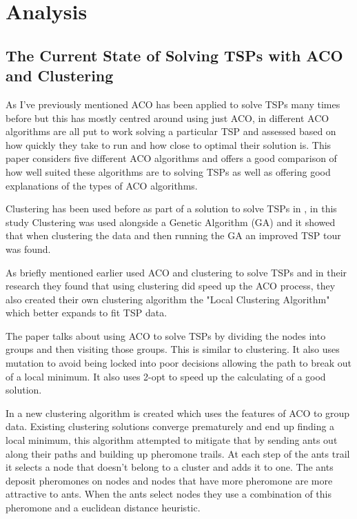 \section{Analysis}

\subsection{The Current State of Solving TSPs with ACO and Clustering}
As I've previously mentioned ACO has been applied to solve TSPs many times before but this has mostly centred around using just ACO, in \cite{assesmentdiffacofortsp} different ACO algorithms are all put to work solving a particular TSP and assessed based on how quickly they take to run and how close to optimal their solution is. This paper considers five different ACO algorithms and offers a good comparison of how well suited these algorithms are to solving TSPs as well as offering good explanations of the types of ACO algorithms. 

Clustering has been used before as part of a solution to solve TSPs in \cite{clustering_with_local_search_heuristic}, in this study Clustering was used alongside a Genetic Algorithm (GA) and it showed that when clustering the data and then running the GA an improved TSP tour was found.

As briefly mentioned earlier \cite{pang_chao-yang_ben-qiong_zhang_jie_wei_shan_zheng-chao_2014} used ACO and clustering to solve TSPs and in their research they found that using clustering did speed up the ACO process, they also created their own clustering algorithm the "Local Clustering Algorithm" which better expands to fit TSP data. 

The paper \cite{yang_shi_marchese_liang_2008} talks about using ACO to solve TSPs by dividing the nodes into groups and then visiting those groups. This is similar to clustering. It also uses mutation to avoid being locked into poor decisions allowing the path to break out of a local minimum. It also uses 2-opt to speed up the calculating of a good solution.

In \cite{10.1007/11839088_31} a new clustering algorithm is created which uses the features of ACO to group data. Existing clustering solutions converge prematurely and end up finding a local minimum, this algorithm attempted to mitigate that by sending ants out along their paths and building up pheromone trails. At each step of the ants trail it selects a node that doesn't belong to a cluster and adds it to one. The ants deposit pheromones on nodes and nodes that have more pheromone are more attractive to ants. When the ants select nodes they use a combination of this pheromone and a euclidean distance heuristic. 

